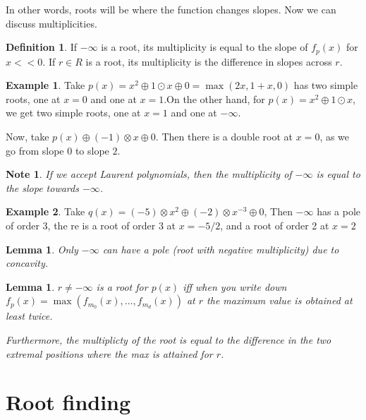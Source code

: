 \documentclass[11pt]{article}
\newtheorem{note}{Note}
\newtheorem{protolemma}[prototheorem]{Lemma}
\newenvironment{lemma}
   {\begin{protolemma}}
   {\end{protolemma}}
\theoremstyle{definition}
\newtheorem{protoexample}{Example}[section]
\newenvironment{ex}
   {\begin{protoexample}}
   {\end{protoexample}}
\newtheorem{protodefinition}{Definition}[section]
\newenvironment{define}
   {\begin{protodefinition}}
   {\end{protodefinition}}
\begin{document}
In other words, roots will be where the function changes slopes. Now we can discuss multiplicities.


\begin{define}
    If $- \infty$ is a root, its multiplicity is equal to the slope of $f_p(x)$ for $x<<0$. If $r\in R$ is a root, its multiplicity is the difference in slopes across $r$.
\end{define}

\begin{ex}
    Take $p(x) = x^2 \oplus 1\odot x \oplus 0= \max(2x,1+x, 0)$  has two simple roots, one at $x=0$ and one at $x=1$.On the other hand, for $p(x) = x^2\oplus 1 \odot x$, we get two simple roots, one at $x=1$ and one at $- \infty$.


    Now, take $p(x) \oplus (-1)\otimes x \oplus 0$. Then there is a double root at $x=0$, as we go from slope $0$ to slope $2$.
\end{ex}



\begin{note}
    If we accept Laurent polynomials, then the multiplicity of $-\infty$ is equal to the slope towards $- \infty$.
\end{note}


\begin{ex}
    Take $q(x) = (-5)\otimes x^2 \oplus (-2) \otimes x^{-3} \oplus 0$, Then $-\infty$ has a pole of order $3$, the re is a root of order 3 at $x= -5/2$, and a root of order 2 at $x=2$
\end{ex}

\begin{lemma}
    Only $-\infty$ can have a pole (root with negative multiplicity) due to concavity.
\end{lemma}


\begin{lemma}
    $r \neq -\infty$ is a root for $p(x)$ iff when you write down $f_p(x) = \max( f_{m_0}(x), \dots, f_{m_d}(x) )$ at $r$ the maximum value is obtained at least twice.

    Furthermore, the multiplicty of the root is equal to the difference in the two extremal positions where the max is attained for $r$.
\end{lemma}







\section{Root finding}
\end{document}

